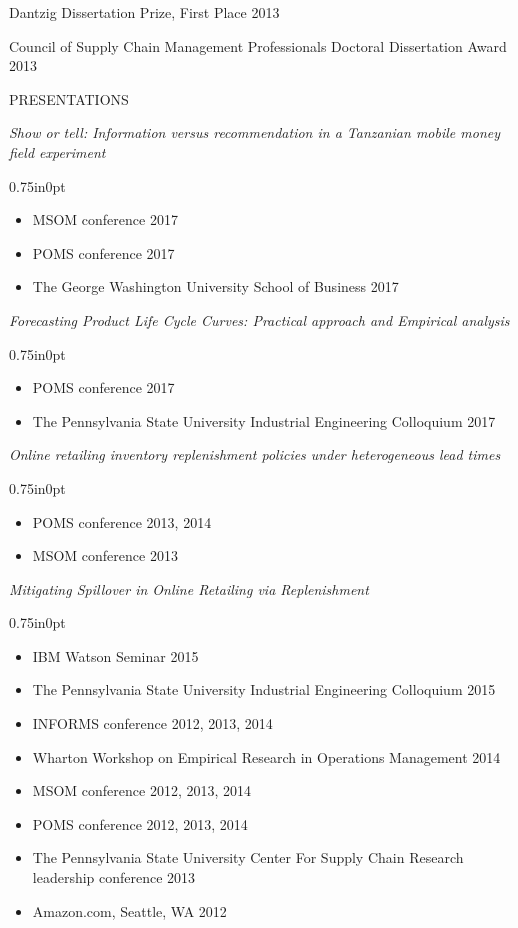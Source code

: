 \documentclass[letterpaper,11pt,oneside]{article}
\newcommand\myIndent{0.75in}
\newcommand\myParSkip{3pt}
\newcommand\myHangIndent{1in}
\newcommand\mySpaceBeforeSection{0.9em}
\newcommand{\NiceIndent}{ \parindent=\myIndent \hangindent=\myHangIndent }
\newenvironment{miniListBullet}
    {
        \begin{adjustwidth}{\myIndent}{0pt}
        \setlength{\parskip}{0pt}%
        \renewcommand\labelitemi{{\boldmath$\cdot$}}
        \begin{itemize}
        \setlength\itemsep{0em}
    }
    {
        \end{itemize}
        \setlength{\parskip}{\myParSkip}%
        \end{adjustwidth}
    }
\begin{document}
\NiceIndent Dantzig Dissertation Prize, First Place 2013

\NiceIndent Council of Supply Chain Management Professionals Doctoral Dissertation Award 2013


\vspace{\mySpaceBeforeSection}

\noindent PRESENTATIONS


\NiceIndent \textit{Show or tell: Information versus recommendation in a {Tanzanian} mobile money field experiment}
\begin{miniListBullet}
    \item MSOM conference 2017
    \item POMS conference 2017
    \item The George Washington University School of Business 2017
\end{miniListBullet}

\NiceIndent \textit{Forecasting Product Life Cycle Curves: Practical approach and Empirical analysis}
\begin{miniListBullet}
    \item POMS conference 2017
    \item The Pennsylvania State University Industrial Engineering Colloquium 2017
\end{miniListBullet}

\NiceIndent \textit{Online retailing inventory replenishment policies under heterogeneous lead times}
\begin{miniListBullet}
    \item POMS conference 2013, 2014
    \item MSOM conference 2013
\end{miniListBullet}

\NiceIndent \textit{Mitigating Spillover in Online Retailing via Replenishment}
\begin{miniListBullet}
    \item IBM Watson Seminar 2015
    \item The Pennsylvania State University Industrial Engineering Colloquium 2015
    \item INFORMS conference 2012, 2013, 2014
    \item Wharton Workshop on Empirical Research in Operations Management 2014
    \item MSOM conference 2012, 2013, 2014
    \item POMS conference 2012, 2013, 2014
    \item The Pennsylvania State University Center For Supply Chain Research leadership conference 2013
    \item Amazon.com, Seattle, WA 2012
\end{miniListBullet}
\end{document}
